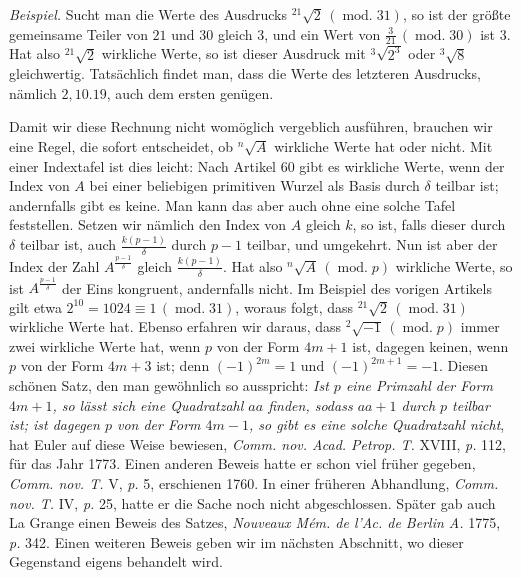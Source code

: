 \emph{Beispiel.} Sucht man die Werte des Ausdrucks ${}^{21}\!\surd {2}\,(\operatorname{mod.}31)$, so ist der größte gemeinsame Teiler von $21$ und $30$ gleich $3$, und ein Wert von $\frac{3}{21}\,(\operatorname{mod.}30)$ ist $3$. Hat also ${}^{21}\!\surd {2}$ wirkliche Werte, so ist dieser Ausdruck mit ${}^{3}\!\surd {2^3}$ oder ${}^{3}\!\surd {8}$ gleichwertig. Tatsächlich findet man, dass die Werte des letzteren Ausdrucks, nämlich $2,10.19$, auch dem ersten genügen.

Damit wir diese Rechnung nicht womöglich vergeblich ausführen, brauchen wir eine Regel, die sofort entscheidet, ob ${}^{n}\!\surd {A}$ wirkliche Werte hat oder nicht. Mit einer Indextafel ist dies leicht: Nach Artikel 60 gibt es wirkliche Werte, wenn der Index von $A$ bei einer beliebigen primitiven Wurzel als Basis durch $\delta$ teilbar ist; andernfalls gibt es keine. Man kann das aber auch ohne eine solche Tafel feststellen. Setzen wir nämlich den Index von $A$ gleich $k$, so ist, falls dieser durch $\delta$ teilbar ist, auch $\frac{k(p-1)}{\delta}$ durch $p-1$ teilbar, und umgekehrt. Nun ist aber der Index der Zahl $A^{\frac{p-1}{\delta}}$ gleich $\frac{k(p-1)}{\delta}$. Hat also ${}^{n}\!\surd {A}\,(\operatorname{mod.}p)$ wirkliche Werte, so ist $A^{\frac{p-1}{\delta}}$ der Eins kongruent, andernfalls nicht. Im Beispiel des vorigen Artikels gilt etwa $2^{10}=1024\equiv1\,(\operatorname{mod.}31)$, woraus folgt, dass ${}^{21}\!\surd {2}\,(\operatorname{mod.}31)$ wirkliche Werte hat.
Ebenso erfahren wir daraus, dass ${}^{2}\!\surd {-1}\,(\operatorname{mod.}p)$ immer zwei wirkliche Werte hat, wenn $p$ von der Form $4m+1$ ist, dagegen keinen, wenn $p$ von der Form $4m+3$ ist; denn $(-1)^{2m}=1$ und $(-1)^{2m+1}=-1$. Diesen schönen Satz, den man gewöhnlich so ausspricht: \emph{Ist $p$ eine Primzahl der Form $4m+1$, so lässt sich eine Quadratzahl $aa$ finden, sodass $aa+1$ durch $p$ teilbar ist; ist dagegen $p$ von der Form $4m-1$, so gibt es eine solche Quadratzahl nicht}, hat Euler auf diese Weise bewiesen, \emph{Comm. nov. Acad. Petrop. T.} XVIII, \emph{p.} 112, für das Jahr 1773. Einen anderen Beweis hatte er schon viel früher gegeben, \emph{Comm. nov. T.} V, \emph{p.} 5, erschienen 1760. In einer früheren Abhandlung, \emph{Comm. nov. T.} IV, \emph{p.} 25, hatte er die Sache noch nicht
abgeschlossen. Später gab auch La Grange einen Beweis des Satzes, \emph{Nouveaux Mém. de l'Ac. de Berlin A.} 1775, \emph{p.} 342. Einen weiteren Beweis geben wir im nächsten Abschnitt, wo dieser Gegenstand eigens behandelt wird.

